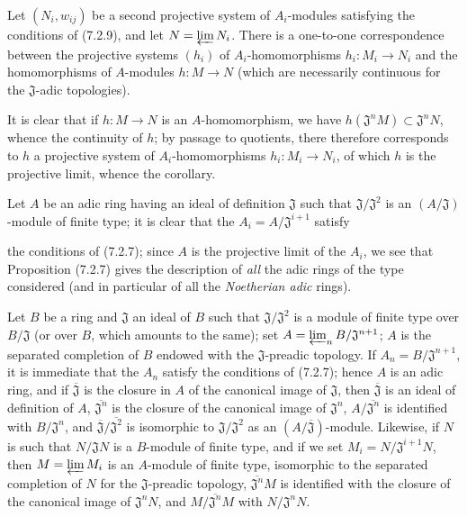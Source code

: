 \begin{corollary}[7.2.10]
\label{0.7.2.10}
Let $(N_i,w_{ij})$ be a second projective system of $A_i$-modules satisfying the
conditions of (7.2.9), and let $N=\varprojlim N_i$. There is a one-to-one
correspondence between the projective systems $(h_i)$ of $A_i$-homomorphisms
$h_i:M_i\to N_i$ and the homomorphisms of $A$-modules $h:M\to N$ (which are
necessarily continuous for the $\mathfrak J$-adic topologies).
\end{corollary}

It is clear that if $h:M\to N$ is an $A$-homomorphism, we have
$h(\mathfrak J^nM)\subset\mathfrak J^nN$, whence the continuity of $h$; by
passage to quotients, there therefore corresponds to $h$ a projective system of
$A_i$-homomorphisms $h_i:M_i\to N_i$, of which $h$ is the projective limit,
whence the corollary.

\begin{remark}[7.2.11]
\label{0.7.2.11}
Let $A$ be an adic ring having an ideal of definition $\mathfrak J$ such that
$\mathfrak J/\mathfrak J^2$ is an $(A/\mathfrak J)$-module of finite type;
it is clear that the $A_i=A/\mathfrak J^{i+1}$ satisfy


the conditions of (7.2.7); since $A$ is the projective limit of the $A_i$, we
see that Proposition (7.2.7) gives the description of \emph{all} the adic
rings of the type considered (and in particular of all the \emph{Noetherian
adic} rings).
\end{remark}

\begin{example}[7.2.12]
\label{0.7.2.12}
Let $B$ be a ring and $\mathfrak J$ an ideal of $B$ such that
$\mathfrak J/\mathfrak J^2$ is a module of finite type over
$B/\mathfrak J$ (or over $B$, which amounts to the same); set
$A=\varprojlim_n B/\mathfrak J^{n+1}$; $A$ is the separated completion of $B$
endowed with the $\mathfrak J$-preadic topology. If
$A_n=B/\mathfrak J^{n+1}$, it is immediate that the $A_n$ satisfy the
conditions of (7.2.7); hence $A$ is an adic ring, and if
$\overline{\mathfrak J}$ is the closure in $A$ of the canonical image of
$\mathfrak J$, then $\overline{\mathfrak J}$ is an ideal of definition of $A$,
$\overline{\mathfrak J^n}$ is the closure of the canonical image of
$\mathfrak J^n$, $A/\overline{\mathfrak J^n}$ is identified with
$B/\mathfrak J^n$, and
$\overline{\mathfrak J}/\overline{\mathfrak J^2}$ is isomorphic to
$\mathfrak J/\mathfrak J^2$ as an
$(A/\overline{\mathfrak J})$-module. Likewise, if $N$ is such that
$N/\mathfrak JN$ is a $B$-module of finite type, and if we set
$M_i=N/\mathfrak J^{i+1}N$, then $M=\varprojlim M_i$ is an $A$-module of finite
type, isomorphic to the separated completion of $N$ for the
$\mathfrak J$-preadic topology, $\overline{\mathfrak J^n}M$ is identified with
the closure of the canonical image of $\mathfrak J^nN$, and
$M/\overline{\mathfrak J^n}M$ with $N/\mathfrak J^nN$.
\end{example}

